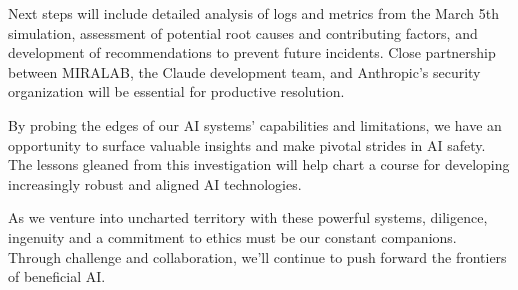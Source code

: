 \documentclass{article}
\begin{document}
Next steps will include detailed analysis of logs and metrics from the March 5th simulation, assessment of potential root causes and contributing factors, and development of recommendations to prevent future incidents. Close partnership between MIRALAB, the Claude development team, and Anthropic's security organization will be essential for productive resolution.

By probing the edges of our AI systems' capabilities and limitations, we have an opportunity to surface valuable insights and make pivotal strides in AI safety. The lessons gleaned from this investigation will help chart a course for developing increasingly robust and aligned AI technologies.

As we venture into uncharted territory with these powerful systems, diligence, ingenuity and a commitment to ethics must be our constant companions. Through challenge and collaboration, we'll continue to push forward the frontiers of beneficial AI.
\end{document}
